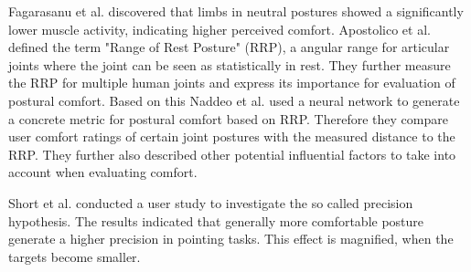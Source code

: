 Fagarasanu et al. \cite{fagarasanu2004measurement} discovered that limbs in neutral postures showed a significantly lower muscle activity, indicating higher perceived comfort. Apostolico et al. \cite{apostolico2014postural} defined the term "Range of Rest Posture" (RRP), a angular range for articular joints where the joint can be seen as statistically in rest. They further measure the RRP for multiple human joints and express its importance for evaluation of postural comfort. Based on this Naddeo et al. \cite{naddeo2015proposal} used a neural network to generate a concrete metric for postural comfort based on RRP. Therefore they compare user comfort ratings of certain joint postures with the measured distance to the RRP. They further also described other potential influential factors to take into account when evaluating comfort.

Short et al. \cite{short1999precision} conducted a user study to investigate the so called precision hypothesis. The results indicated that generally more comfortable posture generate a higher precision in pointing tasks. This effect is magnified, when the targets become smaller. 
